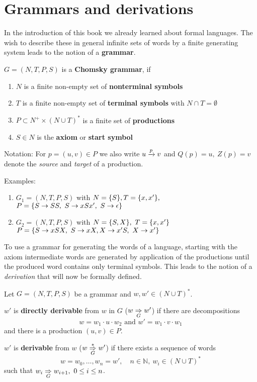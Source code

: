 \section{Grammars and derivations}

In the introduction of this book we already learned about formal languages. The
wish to describe these in general infinite sets of words by a finite generating
system leads to the notion of a {\bf grammar}.

\begin{definition}
$G = (N, T, P, S)$ is a {\bf Chomsky grammar}, if
\begin{enumerate}
  \item $N$ is a finite non-empty set of {\bf nonterminal symbols}
  \item $T$ is a finite non-empty set of {\bf terminal symbols} with
  $N \cap T = \emptyset$
  \item $P \subset N^+ \times (N \cup T)^*$ is a finite set of {\bf productions}
  \item $S \in N$ is the {\bf axiom} or {\bf start symbol} 
\end{enumerate}
\end{definition}

Notation: For $p = (u, v) \in P$ we also write $u \xrightarrow{p} v$ and
$Q(p) = u,\ Z(p) = v$ denote the {\em source} and {\em target} of a production.

Examples:
\begin{enumerate}
  \item $G_1 = (N, T, P, S)$ with $N = \mbox{$\{S\}$}, T = \mbox{$\{x, x'\}$},$ \\ 
  $P = \mbox{$\{S \to SS,\ S \to xSx',\ S \to \epsilon\}$}$
  \item $G_2 = (N, T, P, S)$ with $N = \mbox{$\{S, X\}$},\ T = \mbox{$\{x, x'\}$}$ \\
  $P = \setof{S \to xSX,\ S \to xX, X \to x'S,\ X \to x'}$
\end{enumerate}

To use a grammar for generating the words of a language, starting with the axiom
intermediate words are generated by application of the productions until
the produced word contains only terminal symbols. This leads to the
notion of a {\em derivation} that will now be formally defined.

\begin{definition}
Let $G = (N, T, P, S)$ be a grammar and $w, w' \in (N \cup T)^*$.

$w'$ is {\bf directly derivable} from $w$ in $G$ ($w \underset{G}{\Rightarrow} w'$) if there
are decompositions 
\[ w = w_1 \cdot u \cdot w_2\text{ and }w' = w_1 \cdot v \cdot w_1 \]
and there is a production $(u, v) \in P$.

$w'$ is {\bf derivable} from $w$ ($w \underset{G}{\overset{*}{\Rightarrow}} w'$) if there exists
a sequence of words 
\[ w = w_0, \ldots, w_n = w',\quad n \in \mathbb{N},\ w_i \in (N \cup T)^* \]
such that $w_i \underset{G}{\Rightarrow} w_{i+1},\ 0 \leq i \leq n$.
\end{definition}

